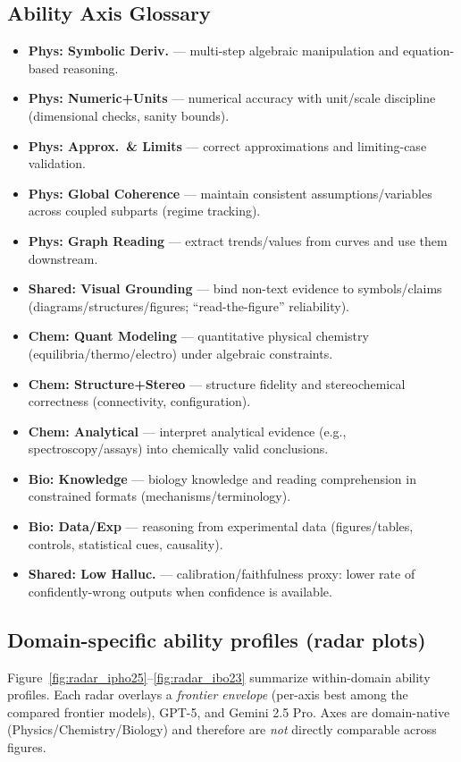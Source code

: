 \documentclass[11pt]{article}
\begin{document}
\subsection*{Ability Axis Glossary}
\begin{itemize}[leftmargin=*, noitemsep, topsep=2pt]
\item \textbf{Phys: Symbolic Deriv.} --- multi-step algebraic manipulation and equation-based reasoning.
\item \textbf{Phys: Numeric+Units} --- numerical accuracy with unit/scale discipline (dimensional checks, sanity bounds).
\item \textbf{Phys: Approx.\ \& Limits} --- correct approximations and limiting-case validation.
\item \textbf{Phys: Global Coherence} --- maintain consistent assumptions/variables across coupled subparts (regime tracking).
\item \textbf{Phys: Graph Reading} --- extract trends/values from curves and use them downstream.
\item \textbf{Shared: Visual Grounding} --- bind non-text evidence to symbols/claims (diagrams/structures/figures; ``read-the-figure'' reliability).
\item \textbf{Chem: Quant Modeling} --- quantitative physical chemistry (equilibria/thermo/electro) under algebraic constraints.
\item \textbf{Chem: Structure+Stereo} --- structure fidelity and stereochemical correctness (connectivity, configuration).
\item \textbf{Chem: Analytical} --- interpret analytical evidence (e.g., spectroscopy/assays) into chemically valid conclusions.
\item \textbf{Bio: Knowledge} --- biology knowledge and reading comprehension in constrained formats (mechanisms/terminology).
\item \textbf{Bio: Data/Exp} --- reasoning from experimental data (figures/tables, controls, statistical cues, causality).
\item \textbf{Shared: Low Halluc.} --- calibration/faithfulness proxy: lower rate of confidently-wrong outputs when confidence is available.
\end{itemize}
\subsection{Domain-specific ability profiles (radar plots)}
\label{app:domain_radars}

Figure~\ref{fig:radar_ipho25}--\ref{fig:radar_ibo23} summarize within-domain ability profiles.
Each radar overlays a \emph{frontier envelope} (per-axis best among the compared frontier models), GPT-5, and Gemini 2.5 Pro.
Axes are domain-native (Physics/Chemistry/Biology) and therefore are \emph{not} directly comparable across figures.
\end{document}
